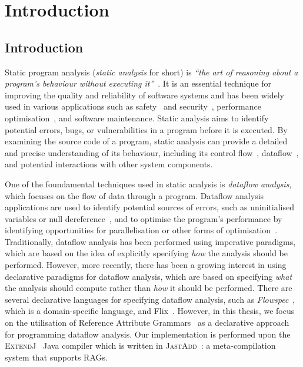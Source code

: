 \chapter{Introduction}
\section{Introduction}

Static program analysis (\emph{static analysis} for short) is
\emph{``the art of reasoning about a program's behaviour without executing it''}~\cite{spa}.
It is an essential technique for improving the quality and reliability of software
systems and has been widely used in various applications such
as safety~\cite{cousot2005astree,Blanchet2002} and security~\cite{piskachev2021secucheck,flowDroid,ayewah2008using,Sayar_2022,fink2012wala},
performance optimisation~\cite{aho2007compilers,appel2004modern}, and software maintenance.
Static analysis aims to identify potential errors, bugs, or vulnerabilities
in a program before it is executed.
By examining the source code of a program, static
analysis can provide a detailed and precise understanding of its behaviour, including
its control flow~\cite{allen1970control}, dataflow~\cite{kam1977monotone},
and potential interactions with other system components.



One of the foundamental techniques used in static analysis is \emph{dataflow analysis},
which focuses on the flow of data through a program. Dataflow analysis applications are used to identify
potential sources of errors, such as uninitialised variables or null dereference~\cite{khedker2017data},
and to optimise the program's performance by identifying opportunities for
parallelisation or other forms of optimisation~\cite{aho2007compilers}.
Traditionally, dataflow analysis has been performed using imperative paradigms,
which are based on the idea of explicitly specifying \emph{how} the analysis should be
performed.
However, more recently, there has been a growing interest in using
declarative paradigms for dataflow analysis, which are based on specifying \emph{what}
the analysis should compute rather than \emph{how} it should be performed.
There are several declarative languages for specifying dataflow analysis, 
such as \emph{Flowspec}~\cite{smits2020flowspec}, which is a domain-specific language,
and Flix~\cite{madsen2016programming}. However, in this thesis, we focus on the utilisation of Reference 
Attribute Grammars~\cite{hedin2000rags} as a declarative approach for programming dataflow analysis. 
Our implementation is performed upon the \textsc{ExtendJ}~\cite{ekman2007jastadd} Java compiler
which is written in \textsc{JastAdd}~\cite{DBLP:journals/entcs/HedinM01}: a
meta-compilation system that supports RAGs.


